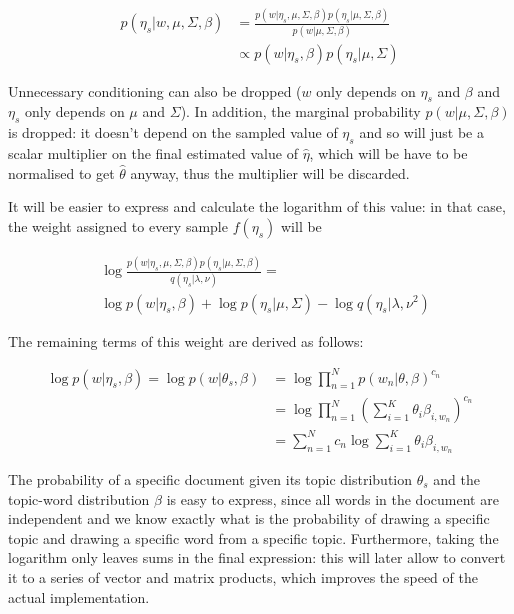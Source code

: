 \documentclass[12pt,a4paper,twoside,openright]{report}
\begin{document}
\begin{align}
p(\eta_s | w, \mu, \Sigma, \beta) &= \frac{p(w | \eta_s, \mu, \Sigma, \beta)p(\eta_s | \mu, \Sigma, \beta)}{p(w | \mu, \Sigma, \beta)}\\
&\propto p(w | \eta_s, \beta) p(\eta_s | \mu, \Sigma)
\end{align}

Unnecessary conditioning can also be dropped ($w$ only depends on $\eta_s$ and $\beta$ and $\eta_s$ only depends on $\mu$ and $\Sigma$). In addition, the marginal probability $p(w | \mu, \Sigma, \beta)$ is dropped: it doesn't depend on the sampled value of $\eta_s$ and so will just be a scalar multiplier on the final estimated value of $\hat\eta$, which will be have to be normalised to get $\hat\theta$ anyway, thus the multiplier will be discarded.

It will be easier to express and calculate the logarithm of this value: in that case, the weight assigned to every sample $f(\eta_s)$ will be

\begin{align}
&\log \frac{p(w | \eta_s, \mu, \Sigma, \beta)p(\eta_s | \mu, \Sigma, \beta)}{q(\eta_s | \lambda, \nu)} = \\
&\log p(w | \eta_s, \beta) + \log p(\eta_s | \mu, \Sigma) - \log q(\eta_s | \lambda, \nu^2)
\end{align}

The remaining terms of this weight are derived as follows:

\begin{align}
\log p(w | \eta_s, \beta) = \log p(w | \theta_s, \beta) &= \log \prod\limits_{n=1}^N p(w_n | \theta, \beta)^{c_n}\\
&= \log \prod\limits_{n=1}^N \left(\sum\limits_{i=1}^K \theta_i \beta_{i, w_n}\right)^{c_n}\\
&= \sum\limits_{n=1}^N c_n \log \sum\limits_{i=1}^K \theta_i \beta_{i, w_n}
\end{align}

The probability of a specific document given its topic distribution $\theta_s$ and the topic-word distribution $\beta$ is easy to express, since all words in the document are independent and we know exactly what is the probability of drawing a specific topic and drawing a specific word from a specific topic. Furthermore, taking the logarithm only leaves sums in the final expression: this will later allow to convert it to a series of vector and matrix products, which improves the speed of the actual implementation.
\end{document}
